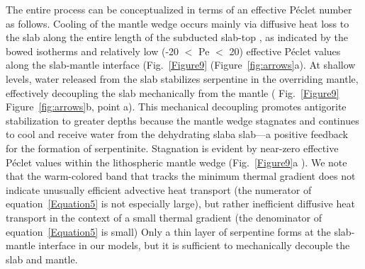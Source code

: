 \documentclass[draft,linenumbers]{agujournal2018} %
\providecommand{\DIFaddtex}[1]{{\protect\color{blue} \sf #1}} %
\providecommand{\DIFdeltex}[1]{{\protect\color{red} \scriptsize #1}} %
\providecommand{\DIFaddbegin}{} %
\providecommand{\DIFaddend}{} %
\providecommand{\DIFdelbegin}{} %
\providecommand{\DIFdelend}{} %
\providecommand{\DIFadd}[1]{\texorpdfstring{\DIFaddtex{#1}}{#1}} %
\providecommand{\DIFdel}[1]{\texorpdfstring{\DIFdeltex{#1}}{}} %
\newcommand{\DIFscaledelfig}{0.3}
\newlength{\DIFdelgraphicswidth} %
\newlength{\DIFdelgraphicsheight} %
\newcommand{\DIFaddincludegraphics}[2][]{{\color{blue}\fbox{\DIFOincludegraphics[#1]{#2}}}} %
\newcommand{\DIFdelincludegraphics}[2][]{%
\sbox{\DIFdelgraphicsbox}{\DIFOincludegraphics[#1]{#2}}%
\settoboxwidth{\DIFdelgraphicswidth}{\DIFdelgraphicsbox} %
\settoboxtotalheight{\DIFdelgraphicsheight}{\DIFdelgraphicsbox} %
\scalebox{\DIFscaledelfig}{%
\parbox[b]{\DIFdelgraphicswidth}{\usebox{\DIFdelgraphicsbox}\\[-\baselineskip] \rule{\DIFdelgraphicswidth}{0em}}\llap{\resizebox{\DIFdelgraphicswidth}{\DIFdelgraphicsheight}{%
\setlength{\unitlength}{\DIFdelgraphicswidth}%
\begin{picture}(1,1)%
\thicklines\linethickness{2pt} %
{\color[rgb]{1,0,0}\put(0,0){\framebox(1,1){}}}%
{\color[rgb]{1,0,0}\put(0,0){\line( 1,1){1}}}%
{\color[rgb]{1,0,0}\put(0,1){\line(1,-1){1}}}%
\end{picture}%
}\hspace*{3pt}}} %
} %
\DeclareRobustCommand{\DIFaddbegin}{\DIFOaddbegin \let\includegraphics\DIFaddincludegraphics} %
\DeclareRobustCommand{\DIFaddend}{\DIFOaddend \let\includegraphics\DIFOincludegraphics} %
\DeclareRobustCommand{\DIFdelbegin}{\DIFOdelbegin \let\includegraphics\DIFdelincludegraphics} %
\DeclareRobustCommand{\DIFdelend}{\DIFOaddend \let\includegraphics\DIFOincludegraphics} %
\begin{document}
The entire process can be conceptualized \DIFdelbegin \DIFdel{in terms of an effective P\'{e}clet number}\DIFdelend \DIFaddbegin \DIFadd{as follows}\DIFaddend . Cooling of the
mantle wedge occurs mainly via diffusive heat loss to the slab along the
entire length of the subducted slab-top \DIFdelbegin \DIFdel{, as indicated by the bowed isotherms and relatively low (-20 $<$ Pe $<$ 20) effective P\'{e}clet values along the slab-mantle interface (Fig.~\ref{Figure9}}\DIFdelend \DIFaddbegin \DIFadd{(Figure~\ref{fig:arrows}}\DIFaddend a). At
shallow levels, water released from the slab stabilizes serpentine in
the overriding mantle, effectively decoupling the slab mechanically from
the mantle (\DIFdelbegin \DIFdel{Fig.~\ref{Figure9}}\DIFdelend \DIFaddbegin \DIFadd{Figure~\ref{fig:arrows}}\DIFaddend b, point a). This mechanical
decoupling promotes antigorite stabilization to greater depths because
the mantle wedge stagnates and continues to cool and receive water from
the dehydrating \DIFdelbegin \DIFdel{slab\textemdash a }\DIFdelend \DIFaddbegin \DIFadd{slab---a }\DIFaddend positive feedback for the formation of
serpentinite. \DIFdelbegin \DIFdel{Stagnation is evident by near-zero effective P\'{e}clet values within the lithospheric mantle wedge (Fig.~\ref{Figure9}a ). We note that the warm-colored band that tracks the minimum thermal gradient does not indicate unusually efficient advective heat transport (the numerator of equation~\ref{Equation5} is not especially large), but rather inefficient diffusive heat transport in the context of a small thermal gradient (the denominator of equation~\ref{Equation5} is small)}\DIFdelend \DIFaddbegin \DIFadd{Only a thin layer of serpentine forms at the slab-mantle
interface in our models, but it is sufficient to mechanically decouple
the slab and mantle}\DIFaddend .
\end{document}
